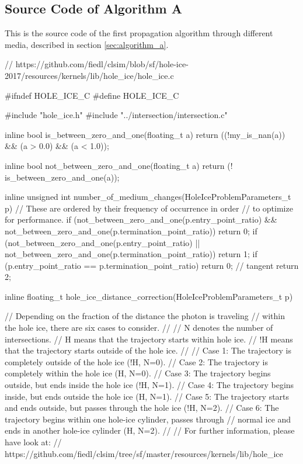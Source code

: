 
\subsection{Source Code of Algorithm A}
\label{sec:algorithm_a_source}

This is the source code of the first propagation algorithm through different media, described in section \ref{sec:algorithm_a}.


\begin{ccode}
// https://github.com/fiedl/clsim/blob/sf/hole-ice-2017/resources/kernels/lib/hole_ice/hole_ice.c

#ifndef HOLE_ICE_C
#define HOLE_ICE_C

#include "hole_ice.h"
#include "../intersection/intersection.c"

inline bool is_between_zero_and_one(floating_t a) {
  return ((!my_is_nan(a)) && (a > 0.0) && (a < 1.0));
}

inline bool not_between_zero_and_one(floating_t a) {
  return (! is_between_zero_and_one(a));
}

inline unsigned int number_of_medium_changes(HoleIceProblemParameters_t p)
{
  // These are ordered by their frequency of occurrence in order
  // to optimize for performance.
  if (not_between_zero_and_one(p.entry_point_ratio) && not_between_zero_and_one(p.termination_point_ratio)) return 0;
  if (not_between_zero_and_one(p.entry_point_ratio) || not_between_zero_and_one(p.termination_point_ratio)) return 1;
  if (p.entry_point_ratio == p.termination_point_ratio) return 0; // tangent
  return 2;
}

inline floating_t hole_ice_distance_correction(HoleIceProblemParameters_t p)
{
  // Depending on the fraction of the distance the photon is traveling
  // within the hole ice, there are six cases to consider.
  //
  // N  denotes the number of intersections.
  // H  means that the trajectory starts within hole ice.
  // !H means that the trajectory starts outside of the hole ice.
  //
  // Case 1: The trajectory is completely outside of the hole ice (!H, N=0).
  // Case 2: The trajectory is completely within the hole ice (H, N=0).
  // Case 3: The trajectory begins outside, but ends inside the hole ice (!H, N=1).
  // Case 4: The trajectory begins inside, but ends outside the hole ice (H, N=1).
  // Case 5: The trajectory starts and ends outside, but passes through the hole ice (!H, N=2).
  // Case 6: The trajectory begins within one hole-ice cylinder, passes through
  //           normal ice and ends in another hole-ice cylinder (H, N=2).
  //
  // For further information, please have look at:
  // https://github.com/fiedl/clsim/tree/sf/master/resources/kernels/lib/hole_ice

}
\end{ccode}
